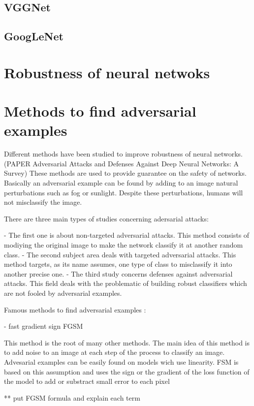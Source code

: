\subsection {VGGNet}
\subsection {GoogLeNet}
\section{Robustness of neural netwoks}



\section{Methods to find adversarial examples}

Different methods have been studied to improve robustness of neural networks. (PAPER Adversarial Attacks and Defenses Against Deep Neural Networks: A Survey)
These methods are used to provide guarantee on the safety of networks. Basically an adversarial example can be found by adding to an image natural perturbations such as fog or sunlight. Despite these perturbations, humans will not misclassify the image.

There are three main types of studies concerning adersarial attacks:

- The first one is about non-targeted adversarial attacks. This method consists of modiying the original image to make the network classify it at another random class.
- The second subject area deals with targeted adversarial attacks. This method targets, as its name assumes, one type of class to misclassify it into another precise one.
- The third study concerns defenses against adversarial attacks. This field deals with the problematic of building robust classifiers which are not fooled by adversarial examples. 

Famous methods to find adversarial examples :

- fast gradient sign FGSM

This method is the root of many other methods. The main idea of this method is to add noise to an image at each step of the process to classify an image. Advesarial examples can be easily found on models wich use linearity. FSM is based on this assumption and uses the sign or the gradient of the loss function of the model to add or substract small error to each pixel

** put FGSM formula and explain each term

